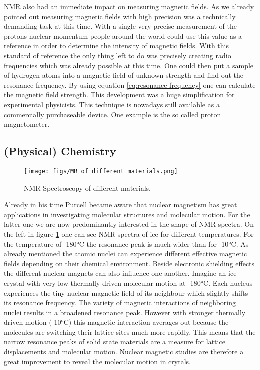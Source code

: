 \documentclass{article}
\begin{document}
NMR also had an immediate impact on measuring magnetic fields. As we already pointed out measuring magnetic fields with high precision was a technically demanding task at this time. With a single very precise measurement of the protons nuclear momentum people around the world could use this value as a reference in order to determine the intensity of magnetic fields. With this standard of reference the only thing left to do was precisely creating radio frequencies which was already possible at this time. One could then put a sample of hydrogen atoms into a magnetic field of unknown strength and find out the resonance frequency. By using equation \ref{eq:resonance frequency} one can calculate the magnetic field strength. This development was a huge simplification for experimental physicists. This technique is nowadays still available as a commercially purchaseable device. One example is the so called proton magnetometer.\\



\subsection{(Physical) Chemistry}

\begin{figure}[h]
    \centering
    \texttt{[image: figs/MR of different materials.png]}
    \caption{NMR-Spectroscopy of different materials.}
    \label{fig:MR of different materials}
\end{figure}

Already in his time Purcell became aware that nuclear magnetism has great applications in investigating molecular structures and molecular motion. For the latter one we are now predominantly interested in the shape of NMR spectra. On the left in figure \ref{fig:MR of different materials} one can see NMR-spectra of ice for different temperatures. For the temperature of -180°C the resonance peak is much wider than for -10°C. As already mentioned the atomic nuclei can experience different effective magnetic fields depending on their chemical environment. Beside electronic shielding effects the different nuclear magnets can also influence one another. Imagine an ice crystal with very low thermally driven molecular motion at -180°C. Each nucleus experiences the tiny nuclear magnetic field of its neighbour which slightly shifts its resonance frequency. The variety of magnetic interactions of neighboring nuclei results in a broadened resonance peak. However with stronger thermally driven motion (-10°C) this magnetic interaction averages out because the molecules are switching their lattice sites much more rapidly. This means that the narrow resonance peaks of solid state materials are a measure for lattice displacements and molecular motion. Nuclear magnetic studies are therefore a great improvement to reveal the molecular motion in crytals.\\
\end{document}
